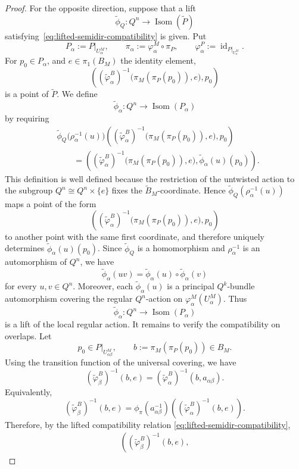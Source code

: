 \documentclass[10pt,a4paper]{amsart}
\newcommand{\e}{e}
\begin{document}
\begin{proof}
For the opposite direction, suppose that a lift
\[
\widetilde\phi_Q:
Q^n\longrightarrow\operatorname{Isom}(\widetilde P)
\]
satisfying~\eqref{eq:lifted-semidir-compatibility} is given. Put
\[
P_\alpha:=P|_{U_\alpha^M},
\qquad
\pi_\alpha:=\varphi_\alpha^M\circ\pi_P,
\qquad
\varphi_\alpha^P:=\operatorname{id}_{P|_{U_\alpha^M}}.
\]
For \(p_0\in P_\alpha\), and \(\e\in \pi_1(B_M)\) the identity element, 
\[
\left(
(\widetilde\varphi_\alpha^B)^{-1}
\bigl(\pi_M(\pi_P(p_0)),e\bigr),
p_0
\right)
\]
is a point of \(\widetilde P\). We define
\[
\widetilde\phi_\alpha:
Q^n\longrightarrow\operatorname{Isom}(P_\alpha)
\]
by requiring
\begin{align*}
&
\widetilde\phi_Q\bigl(\rho_\alpha^{-1}(u)\bigr)
\left(
(\widetilde\varphi_\alpha^B)^{-1}
\bigl(\pi_M(\pi_P(p_0)),e\bigr),
p_0
\right)
\\
&\qquad =
\left(
(\widetilde\varphi_\alpha^B)^{-1}
\bigl(\pi_M(\pi_P(p_0)),e\bigr),
\widetilde\phi_\alpha(u)(p_0)
\right).
\end{align*}
This definition is well defined because the restriction of the untwisted action to the subgroup $Q^n\cong Q^n\times\{e\}$
fixes the \(\widetilde B_M\)-coordinate. Hence
\(\widetilde\phi_Q(\rho_\alpha^{-1}(u))\) maps a point of the form
\[
\left(
(\widetilde\varphi_\alpha^B)^{-1}
\bigl(\pi_M(\pi_P(p_0)),e\bigr),
p_0
\right)
\]
to another point with the same first coordinate, and therefore uniquely determines \(\widetilde\phi_\alpha(u)(p_0)\). Since \(\widetilde\phi_Q\) is a homomorphism and \(\rho_\alpha^{-1}\) is an automorphism of \(Q^n\), we have
\[
\widetilde\phi_\alpha(uv)
=
\widetilde\phi_\alpha(u)\circ
\widetilde\phi_\alpha(v)
\]
for every \(u,v\in Q^n\). Moreover, each \(\widetilde\phi_\alpha(u)\) is a principal \(Q^k\)-bundle automorphism covering the regular \(Q^n\)-action on
\(\varphi_\alpha^M(U_\alpha^M)\). Thus
\[
\widetilde\phi_\alpha:
Q^n\longrightarrow\operatorname{Isom}(P_\alpha)
\]
is a lift of the local regular action. It remains to verify the compatibility on overlaps. Let
\[
p_0\in P|_{U_{\alpha\beta}^M},
\qquad
b:=\pi_M(\pi_P(p_0))\in B_M.
\]
Using the transition function of the universal covering, we have
\[
(\widetilde\varphi_\beta^B)^{-1}(b,e)
=
(\widetilde\varphi_\alpha^B)^{-1}(b,a_{\alpha\beta}).
\]
Equivalently,
\[
(\widetilde\varphi_\beta^B)^{-1}(b,e)
=
\phi_\pi(a_{\alpha\beta}^{-1})
\left(
(\widetilde\varphi_\alpha^B)^{-1}(b,e)
\right).
\]
Therefore, by the lifted compatibility relation
\eqref{eq:lifted-semidir-compatibility},
\begin{align*}
\left(
(\widetilde\varphi_\beta^B)^{-1}(b,e),

\end{align*}
\end{proof}
\end{document}
